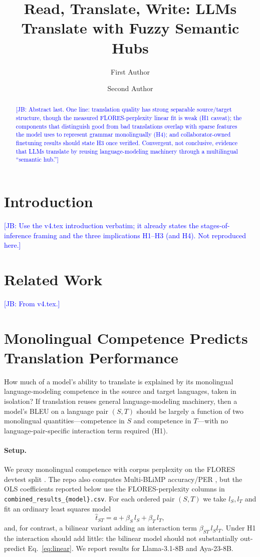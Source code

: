 \documentclass[11pt]{article}
\title{Read, Translate, Write: LLMs Translate with Fuzzy Semantic Hubs}
\author{First Author \and Second Author}
\newcommand{\jb}[1]{\textcolor{blue}{[JB: #1]}} %
\begin{document}
\maketitle
\begin{abstract}
\jb{Abstract last. One line: translation quality has strong separable
source/target structure, though the measured FLORES-perplexity linear fit is
weak (H1 caveat); the components that distinguish good from bad translations
overlap with sparse features the model uses to represent grammar monolingually
(H4); and collaborator-owned finetuning results should state H3 once verified.
Convergent, not conclusive, evidence that LLMs translate by reusing
language-modeling machinery through a multilingual ``semantic hub.''}
\end{abstract}

\section{Introduction}
\jb{Use the v4.tex introduction verbatim; it already states the stages-of-inference
framing and the three implications H1--H3 (and H4). Not reproduced here.}

\section{Related Work}
\jb{From v4.tex.}

\section{Monolingual Competence Predicts Translation Performance}
\label{sec:linear}

How much of a model's ability to translate is explained by its monolingual
language-modeling competence in the source and target languages, taken in
isolation? If translation reuses general language-modeling machinery, then a
model's BLEU on a language pair $(S,T)$ should be largely a function of two
monolingual quantities---competence in $S$ and competence in $T$---with no
language-pair-specific interaction term required (H1).

\paragraph{Setup.} We proxy monolingual competence with corpus perplexity on the
FLORES devtest split \citep{goyal2022flores}. The repo also computes
Multi-BLiMP accuracy/PER \citep{jumelet2025multiblimp}, but the OLS coefficients
reported below use the FLORES-perplexity columns in
\texttt{combined\_results\_\{model\}.csv}. For each ordered pair $(S,T)$ we take
$l_S, l_T$ and fit an ordinary least squares model
\begin{equation}
\hat{t}_{ST} = a + \beta_S\, l_S + \beta_T\, l_T,
\label{eq:linear}
\end{equation}
and, for contrast, a bilinear variant adding an interaction term
$\beta_{ST}\, l_S l_T$. Under H1 the interaction should add little: the bilinear
model should not substantially out-predict Eq.~\ref{eq:linear}. We report
results for Llama-3.1-8B and Aya-23-8B.
\end{document}
